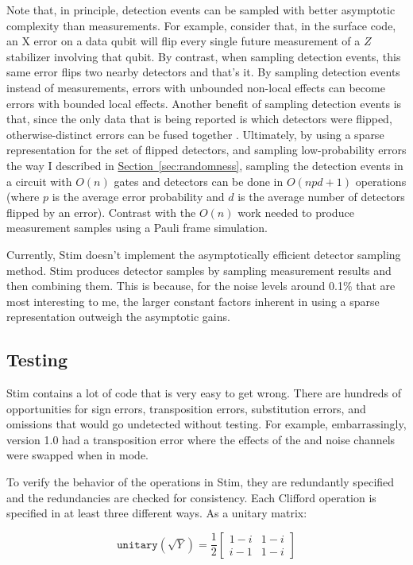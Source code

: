 \documentclass[onecolumn,unpublished]{quantumarticle}
\theoremstyle{definition}
\theoremstyle{definition}
\theoremstyle{definition}
\renewcommand{\sec}[1]{\hyperref[sec:#1]{Section~\ref*{sec:#1}}}
\begin{document}
Note that, in principle, detection events can be sampled with better asymptotic complexity than measurements.
For example, consider that, in the surface code, an X error on a data qubit will flip every single future measurement of a $Z$ stabilizer involving that qubit.
By contrast, when sampling detection events, this same error flips two nearby detectors and that's it.
By sampling detection events instead of measurements, errors with unbounded non-local effects can become errors with bounded local effects.
Another benefit of sampling detection events is that, since the only data that is being reported is which detectors were flipped, otherwise-distinct errors can be fused together \cite{chao2020optimization}.
Ultimately, by using a sparse representation for the set of flipped detectors, and sampling low-probability errors the way I described in \sec{randomness}, sampling the detection events in a circuit with $O(n)$ gates and detectors can be done in $O(npd + 1)$ operations (where $p$ is the average error probability and $d$ is the average number of detectors flipped by an error).
Contrast with the $O(n)$ work needed to produce measurement samples using a Pauli frame simulation.

Currently, Stim doesn't implement the asymptotically efficient detector sampling method.
Stim produces detector samples by sampling measurement results and then combining them.
This is because, for the noise levels around 0.1\% that are most interesting to me, the larger constant factors inherent in using a sparse representation outweigh the asymptotic gains.

\subsection{Testing}

Stim contains a lot of code that is very easy to get wrong.
There are hundreds of opportunities for sign errors, transposition errors, substitution errors, and omissions that would go undetected without testing.
For example, embarrassingly, version 1.0 had a transposition error where the effects of the  and  noise channels were swapped when in  mode.

To verify the behavior of the operations in Stim, they are redundantly specified and the redundancies are checked for consistency.
Each Clifford operation is specified in at least three different ways.
As a unitary matrix:

$$
\texttt{unitary}(\sqrt{Y}) = \frac{1}{2}\begin{bmatrix}
    1 - i & 1 - i \\
    i - 1 & 1 - i
\end{bmatrix}
$$
\end{document}
